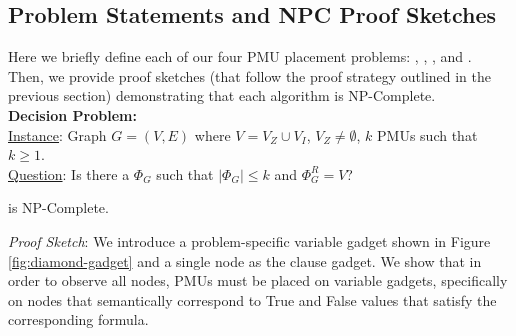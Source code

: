 


\subsection{Problem Statements and NPC Proof Sketches}
\label{subsec:pmu-prob-stmt}

Here we briefly define each of our four PMU placement problems: \fulls, \maxincs, \xvalparts, and \xvals.   Then, we provide proof sketches (that follow the proof strategy outlined in the previous section)
demonstrating that each algorithm is NP-Complete. \\ 
{\bf \full Decision Problem:} \\
\indent \underline{Instance}: Graph $G=(V,E)$ where $V=V_Z \cup V_I$, $V_Z \neq \emptyset$, $k$ PMUs such that $k \geq 1$. \\
\indent \underline{Question}: Is there a $\Phi_G$ such that $|\Phi_G| \leq k$ and $\Phi^R_G = V$? 

\begin{theorem}
\full is NP-Complete.
\label{thm:npc-full}
\end{theorem}

{\it Proof Sketch}:  We introduce a problem-specific variable gadget shown in Figure \ref{fig:diamond-gadget} and a single node as the clause gadget. We show that in order to observe all nodes, PMUs must be placed on variable gadgets, specifically on
nodes that semantically correspond to True and False values that satisfy the corresponding \sat formula. 


